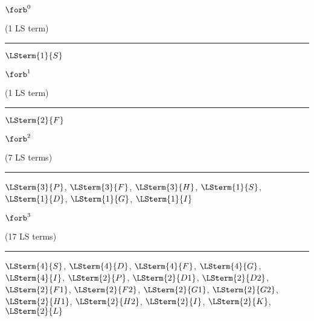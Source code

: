 \begin{mdframed}\begin{center}
$\forb^{0}$

(1 LS term)
\vspace{0.25cm}\hrule\vspace{0.25cm}

$\LSterm{1}{S}$
\end{center}\end{mdframed}

\begin{mdframed}\begin{center}
$\forb^{1}$

(1 LS term)
\vspace{0.25cm}\hrule\vspace{0.25cm}

$\LSterm{2}{F}$
\end{center}\end{mdframed}

\begin{mdframed}\begin{center}
$\forb^{2}$

(7 LS terms)
\vspace{0.25cm}\hrule\vspace{0.25cm}

$\LSterm{3}{P}$, $\LSterm{3}{F}$, $\LSterm{3}{H}$, $\LSterm{1}{S}$, $\LSterm{1}{D}$, $\LSterm{1}{G}$, $\LSterm{1}{I}$
\end{center}\end{mdframed}

\begin{mdframed}\begin{center}
$\forb^{3}$

(17 LS terms)
\vspace{0.25cm}\hrule\vspace{0.25cm}

$\LSterm{4}{S}$, $\LSterm{4}{D}$, $\LSterm{4}{F}$, $\LSterm{4}{G}$, $\LSterm{4}{I}$, $\LSterm{2}{P}$, $\LSterm{2}{D1}$, $\LSterm{2}{D2}$, $\LSterm{2}{F1}$, $\LSterm{2}{F2}$, $\LSterm{2}{G1}$, $\LSterm{2}{G2}$, $\LSterm{2}{H1}$, $\LSterm{2}{H2}$, $\LSterm{2}{I}$, $\LSterm{2}{K}$, $\LSterm{2}{L}$
\end{center}\end{mdframed}

